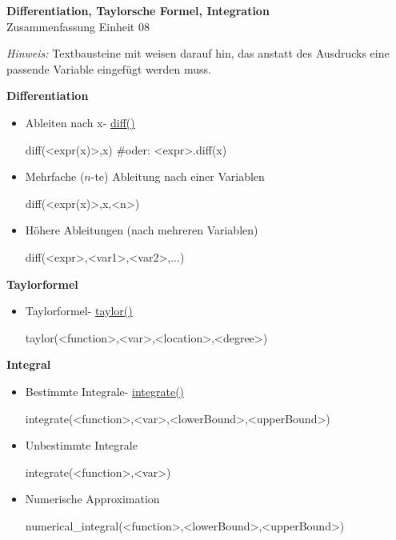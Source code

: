 \documentclass[a4paper,9pt,DIV15,twocolumn]{scrartcl}
\begin{document}
\begin{center}
    \textbf{\LARGE Differentiation, Taylorsche Formel, Integration}\\
    {\large Zusammenfassung Einheit 08}
\end{center}
\textsl{Hinweis:} Textbausteine mit  weisen darauf hin, das anstatt des Ausdrucks eine passende Variable eingefügt werden muss.

\medskip

\textbf{Differentiation}

\begin{itemize}
 \item Ableiten nach x- \href{https://sage.math.uni-goettingen.de/doc/static/reference/sage/calculus/functional.html?highlight=diff#sage.calculus.functional.diff}{diff()}
\begin{sagein}
diff(<expr(x)>,x) #oder: <expr>.diff(x)
\end{sagein}
\item Mehrfache ($n$-te) Ableitung nach einer Variablen
\begin{sagein}
diff(<expr(x)>,x,<n>) 
\end{sagein}
\item H\"ohere Ableitungen (nach mehreren Variablen)
	\begin{sagein}
diff(<expr>,<var1>,<var2>,$\ldots$)
	\end{sagein}

\end{itemize}

\textbf{Taylorformel}

\begin{itemize}
 \item Taylorformel- \href{https://sage.math.uni-goettingen.de/doc/static/reference/sage/calculus/functional.html?highlight=diff#sage.calculus.functional.integral}{taylor()}
\begin{sagein}
taylor(<function>,<var>,<location>,<degree>)
\end{sagein}
\end{itemize}

\textbf{Integral}

\begin{itemize}
 \item Bestimmte Integrale- \href{https://sage.math.uni-goettingen.de/doc/static/reference/sage/calculus/functional.html?highlight=diff#sage.calculus.functional.integral}{integrate()}
\begin{sagein}
integrate(<function>,<var>,<lowerBound>,<upperBound>) 
\end{sagein}
\item Unbestimmte Integrale
\begin{sagein}
integrate(<function>,<var>)
\end{sagein}
\item Numerische Approximation
\begin{sagein}
numerical_integral(<function>,<lowerBound>,<upperBound>) 
\end{sagein}
\end{itemize}
\end{document}
